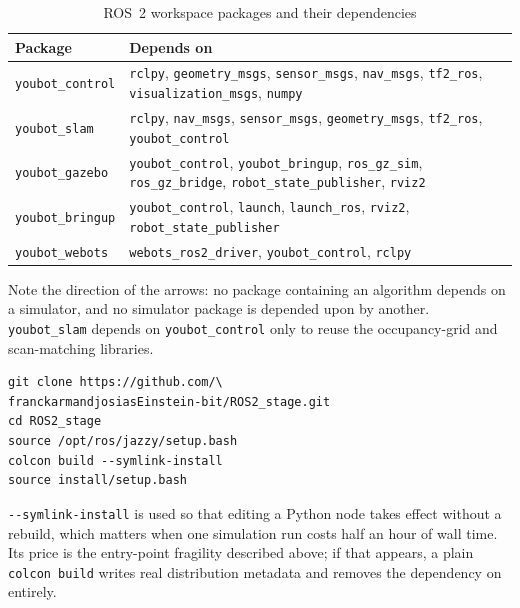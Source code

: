 \begin{table}[!t]
\caption{ROS~2 workspace packages and their dependencies}
\label{tab:packages}
\centering\footnotesize
\begin{tabular}{@{}p{}p{}@{}}
\toprule
\textbf{Package} & \textbf{Depends on}\\
\midrule
\texttt{youbot\_control} &
  \texttt{rclpy}, \texttt{geometry\_msgs}, \texttt{sensor\_msgs},
  \texttt{nav\_msgs}, \texttt{tf2\_ros},
  \texttt{visualization\_msgs}, \texttt{numpy}\\
\texttt{youbot\_slam} &
  \texttt{rclpy}, \texttt{nav\_msgs}, \texttt{sensor\_msgs},
  \texttt{geometry\_msgs}, \texttt{tf2\_ros},
  \texttt{youbot\_control}\\
\texttt{youbot\_gazebo} &
  \texttt{youbot\_control}, \texttt{youbot\_bringup},
  \texttt{ros\_gz\_sim}, \texttt{ros\_gz\_bridge},
  \texttt{robot\_state\_publisher}, \texttt{rviz2}\\
\texttt{youbot\_bringup} &
  \texttt{youbot\_control}, \texttt{launch}, \texttt{launch\_ros},
  \texttt{rviz2}, \texttt{robot\_state\_publisher}\\
\texttt{youbot\_webots} &
  \texttt{webots\_ros2\_driver}, \texttt{youbot\_control},
  \texttt{rclpy}\\
\bottomrule
\end{tabular}
\end{table}

Note the direction of the arrows: no package containing an algorithm
depends on a simulator, and no simulator package is depended upon by
another. \texttt{youbot\_slam} depends on \texttt{youbot\_control} only
to reuse the occupancy-grid and scan-matching libraries.

\begin{lstlisting}[style=bash,caption={Cloning and building.},
label={lst:build}]
git clone https://github.com/\
franckarmandjosiasEinstein-bit/ROS2_stage.git
cd ROS2_stage
source /opt/ros/jazzy/setup.bash
colcon build --symlink-install
source install/setup.bash
\end{lstlisting}

\texttt{-{}-symlink-install} is used so that editing a Python node takes
effect without a rebuild, which matters when one simulation run costs
half an hour of wall time. Its price is the entry-point fragility
described above; if that appears, a plain \texttt{colcon build} writes
real distribution metadata and removes the dependency on
 entirely.

